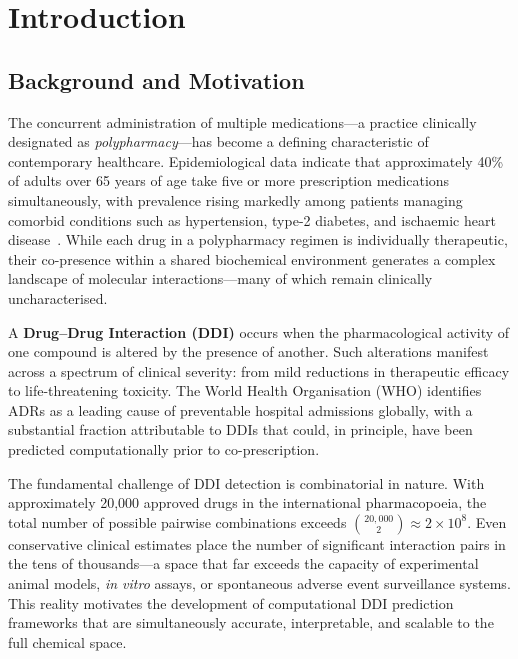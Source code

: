 \documentclass[12pt,a4paper,oneside]{report}
\begin{document}
\newpage
\tableofcontents
{}

\setcounter{page}{1}

\chapter{Introduction}
\label{chap:intro}

\section{Background and Motivation}

The concurrent administration of multiple medications---a practice clinically designated as
\textit{polypharmacy}---has become a defining characteristic of contemporary healthcare.
Epidemiological data indicate that approximately 40\% of adults over 65 years of age take
five or more prescription medications simultaneously, with prevalence rising markedly among
patients managing comorbid conditions such as hypertension, type-2 diabetes, and ischaemic
heart disease~\cite{hajjar2007polypharmacy}. While each drug in a polypharmacy regimen is
individually therapeutic, their co-presence within a shared biochemical environment generates
a complex landscape of molecular interactions---many of which remain clinically uncharacterised.

A \textbf{Drug--Drug Interaction (DDI)} occurs when the pharmacological activity of one
compound is altered by the presence of another. Such alterations manifest across a spectrum
of clinical severity: from mild reductions in therapeutic efficacy to life-threatening
toxicity. The World Health Organisation (WHO) identifies ADRs as a leading cause of
preventable hospital admissions globally, with a substantial fraction attributable to DDIs
that could, in principle, have been predicted computationally prior to co-prescription.

The fundamental challenge of DDI detection is combinatorial in nature. With approximately
20,000 approved drugs in the international pharmacopoeia, the total number of possible
pairwise combinations exceeds $\binom{20{,}000}{2} \approx 2 \times 10^8$. Even conservative
clinical estimates place the number of significant interaction pairs in the tens of
thousands---a space that far exceeds the capacity of experimental animal models, \textit{in
vitro} assays, or spontaneous adverse event surveillance systems. This reality motivates the
development of computational DDI prediction frameworks that are simultaneously accurate,
interpretable, and scalable to the full chemical space.
\end{document}
